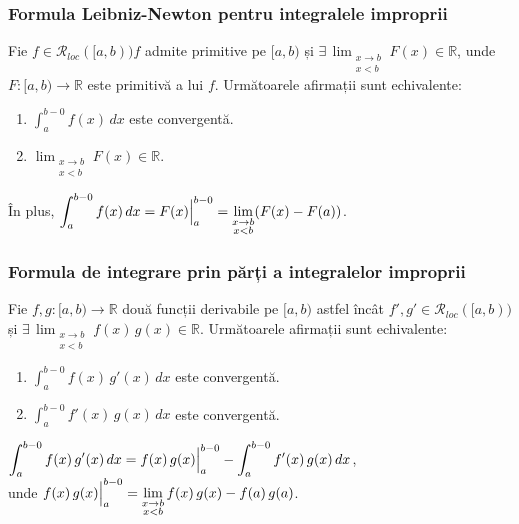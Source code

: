 \subsubsection{Formula Leibniz-Newton pentru integralele improprii}
Fie $f \in \mathcal{R}_{loc}([a,b)) f$ admite primitive pe $[a, b)$ și $\exists \, \displaystyle\lim_{\substack{x \rightarrow b \\ x < b}} F(x) \in \mathbb{R}$,
unde $F:[a,b) \rightarrow \mathbb{R}$ este primitivă a lui $f$. Următoarele afirmații sunt echivalente:
\begin{enumerate}[label=\emph{\alph*})]
    \item $\displaystyle\int_{a}^{b-0} f(x) \, dx$ este convergentă.
    \item $\displaystyle\lim_{\substack{x \rightarrow b \\ x < b}} F(x) \in \mathbb{R}$.
\end{enumerate}
În plus, $\displaystyle\int_{a}^{b-0} f(x) \, dx = \Bigl. F(x) \Bigr|_{a}^{b-0} = \displaystyle\lim_{\substack{x \rightarrow b \\ x < b}} (F(x) - F(a))$.

\subsubsection{Formula de integrare prin părți a integralelor improprii}
Fie $f, g:[a,b) \rightarrow \mathbb{R}$ două funcții derivabile pe $[a,b)$ astfel încât
$f', g' \in \mathcal{R}_{loc}([a,b))$ și $\exists \, \displaystyle\lim_{\substack{x \rightarrow b \\ x < b}} f(x) \, g(x) \in \mathbb{R}$.
Următoarele afirmații sunt echivalente:

\begin{enumerate}[label=\emph{\alph*})]
    \item $\displaystyle\int_{a}^{b-0} f(x) \, g'(x) \, dx$ este convergentă.
    \item $\displaystyle\int_{a}^{b-0} f'(x) \, g(x) \, dx$ este convergentă.
\end{enumerate}
$\displaystyle\int_{a}^{b-0} f(x) \, g'(x) \, dx = \Bigl. f(x) \, g(x) \Bigr|_{a}^{b-0} - \displaystyle\int_{a}^{b-0} f'(x) \, g(x) \, dx$, \\
unde $\Bigl. f(x) \, g(x) \Bigr|_{a}^{b-0} = \displaystyle\lim_{\substack{x \rightarrow b \\ x < b}} f(x) \, g(x) - f(a) \, g(a)$.

